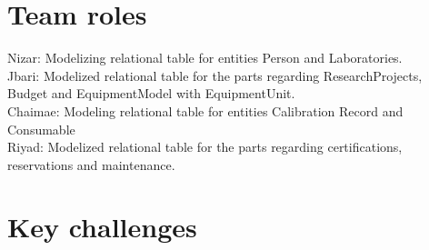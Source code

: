 \documentclass[a4paper,12pt]{article}
\begin{document}
\section{Team roles}
Nizar: Modelizing relational table for entities Person and Laboratories.\\
Jbari: Modelized relational table for the parts regarding ResearchProjects, Budget and EquipmentModel with EquipmentUnit.\\
Chaimae: Modeling relational table for entities Calibration Record and Consumable\\
Riyad: Modelized relational table for the parts regarding certifications, reservations and maintenance.\\


\section{Key challenges}
\end{document}
